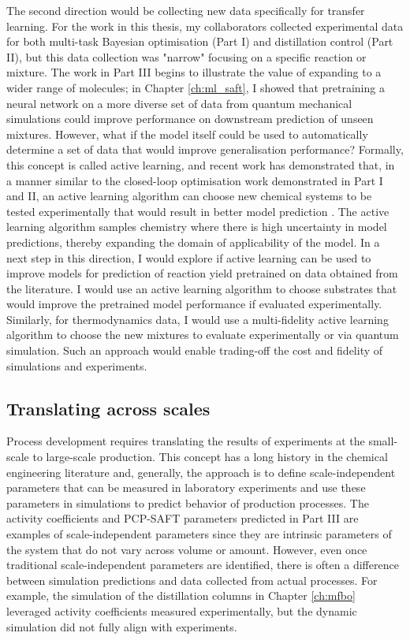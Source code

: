The second direction would be collecting new data specifically for transfer learning. For the work in this thesis, my collaborators collected experimental data for both multi-task Bayesian optimisation (Part I) and distillation control (Part II), but this data collection was "narrow" focusing on a specific reaction or mixture. The work in Part III begins to illustrate the value of expanding to a wider range of molecules; in Chapter \ref{ch:ml_saft}, I showed that pretraining a neural network on a more diverse set of data from quantum mechanical simulations could improve performance on downstream prediction of unseen mixtures. However, what if the model itself could be used to automatically determine a set of data that would  improve generalisation performance? Formally, this concept is called active learning, and recent work has demonstrated that, in a manner similar to the closed-loop optimisation work demonstrated in Part I and II, an active learning algorithm can choose new chemical systems to be tested experimentally that would result in better model prediction \cite{Angello2022}. The active learning algorithm samples chemistry where there is high uncertainty in model predictions, thereby expanding the domain of applicability of the model.  In a next step in this direction, I would explore if active learning can be used to improve models for prediction of reaction yield pretrained on data obtained from the literature. I would use an active learning algorithm to choose substrates that would improve the pretrained model performance if evaluated experimentally. Similarly, for thermodynamics data, I would use a multi-fidelity active learning algorithm to choose the new mixtures to evaluate experimentally or via quantum simulation. Such an approach would enable trading-off the cost and fidelity of simulations and experiments. 

\subsection{Translating across scales}

Process development requires translating the results of experiments at the small-scale to large-scale production. This concept has a long history in the chemical engineering literature and, generally, the approach is to define scale-independent parameters that can be measured in laboratory experiments and use these parameters in simulations to predict behavior of production processes. The activity coefficients and PCP-SAFT parameters predicted in Part III are examples of scale-independent parameters since they are intrinsic parameters of the system that do not vary across volume or amount. However, even once traditional  scale-independent parameters are identified, there is often a difference between simulation predictions and data collected from actual processes. For example, the simulation of the distillation columns in Chapter \ref{ch:mfbo} leveraged activity coefficients measured experimentally, but the dynamic simulation did not fully align with experiments. 

